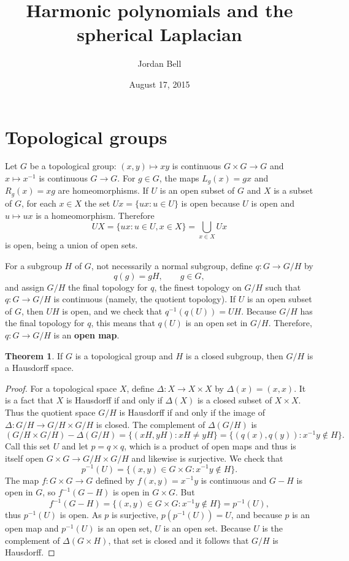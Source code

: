 \documentclass{article}
\theoremstyle{definition}
\newtheorem{theorem}{Theorem}
\theoremstyle{definition}
\begin{document}
\title{Harmonic polynomials and the spherical Laplacian}
\author{Jordan Bell}
\date{August 17, 2015}

\maketitle

\section{Topological groups}
\label{topologicalgroups}
Let $G$ be a topological group: $(x,y)  \mapsto xy$ is continuous $G \times G \to G$ and $x \mapsto x^{-1}$ is continuous $G \to G$.
For $g \in G$, the maps $L_g(x)=gx$ and $R_g(x)=xg$ are homeomorphisms. 
If $U$ is an open subset of $G$ and  $X$ is a subset of $G$, for each $x \in X$ the set $Ux=\{ux:u \in U\}$ is open because $U$ is
open and $u \mapsto ux$ is a homeomorphism. Therefore
\[
UX =\{ux: u\in U, x \in X\}= \bigcup_{x \in X} Ux
\]
is open, being a union of open sets. 

For a subgroup $H$ of $G$, not necessarily a normal subgroup, define 
$q:G \to G/H$ by 
\[
q(g) = gH,\qquad g \in G,
\]
and assign $G/H$ the final topology for $q$,
the finest topology on $G/H$ such that $q:G \to G/H$ is continuous (namely, the quotient
topology). 
If $U$ is an open subset of $G$, then $UH$ is open, and we check that
$q^{-1}(q(U)) = UH$. Because 
$G/H$ has the final topology for $q$, 
this means that $q(U)$ is an open set in $G/H$. Therefore, $q:G \to G/H$ is an \textbf{open map}. 

\begin{theorem}
If $G$ is a topological group and $H$ is a closed subgroup, then $G/H$ is a Hausdorff space.
\end{theorem}
\begin{proof}
For  a topological space $X$,  define $\Delta:X \to X \times X$ by $\Delta(x)=(x,x)$. 
It is a fact that $X$ is Hausdorff if and only if $\Delta(X)$ is a closed subset of $X \times X$. Thus
the quotient space $G/H$ is Hausdorff if and only if 
the image of $\Delta:G/H \to G/H \times G/H$ is closed. The complement of $\Delta(G/H)$ is
\[
(G/H \times G/H) - \Delta(G/H)
=\{(xH,yH) : xH \neq yH\}
=\{(q(x),q(y))  : x^{-1}y \not \in H\}.
\]
Call this set $U$ and let $p=q \times q$, which is a product of open maps and thus is itself open $G \times G 
\to G/H \times G/H$ and likewise is surjective. 
We check that 
\[
p^{-1}(U) = \{(x,y) \in G \times G: x^{-1} y \not \in H\}.
\]
The map $f:G \times G \to G$ defined by $f(x,y) = x^{-1}y$ is continuous and $G - H$ is open in $G$, so $f^{-1}(G - H)$
is open in $G \times G$. But
\[
f^{-1}(G - H) = \{(x,y) \in G \times G: x^{-1}y \not \in H\} = p^{-1}(U),
\]
thus $p^{-1}(U)$ is open. 
As $p$ is surjective, $p(p^{-1}(U))=U$, and because $p$ is an open map and $p^{-1}(U)$ is an open
set, $U$ is an open set. Because $U$ is the complement of $\Delta(G \times H)$, that set is closed and it follows
that $G/H$ is Hausdorff. 
\end{proof}
\end{document}
